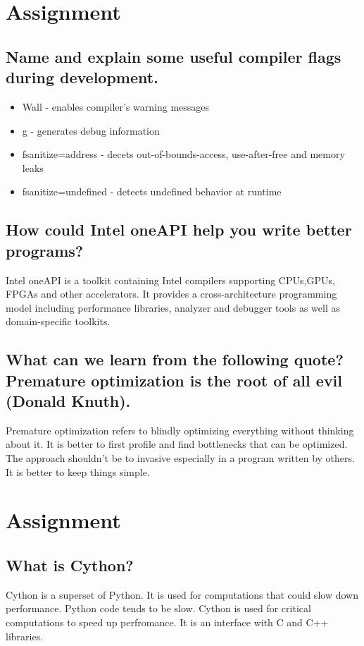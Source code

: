 \documentclass[runningheads]{llncs}
\begin{document}
\section{Assignment}

\subsection{Name and explain some useful compiler flags during development.}
\begin{itemize}
	\item Wall - enables compiler's warning messages
	\item g - generates debug information
	\item fsanitize=address - decets out-of-bounds-access, use-after-free and memory leaks
	\item fsanitize=undefined - detects undefined behavior at runtime
\end{itemize}


\subsection{How could Intel oneAPI help you write better programs?}
Intel oneAPI is a toolkit containing Intel compilers supporting CPUs,GPUs, FPGAs and other accelerators.
It provides a cross-architecture programming model including performance libraries, analyzer and debugger tools as well as 
domain-specific toolkits.

\subsection{What can we learn from the following quote? Premature optimization is the root of all evil (Donald Knuth).}
Premature optimization refers to blindly optimizing everything without thinking about it.
It is better to first profile and find bottlenecks that can be optimized.
The approach shouldn't be to invasive especially in a program written by others.
It is better to keep things simple.

\section{Assignment}

\subsection{What is Cython?}
Cython is a superset of Python. 
It is used for computations that could slow down performance.
Python code tends to be slow. 
Cython is used for critical computations to speed up perfromance.
It is an interface with C and C++ libraries.
\end{document}
